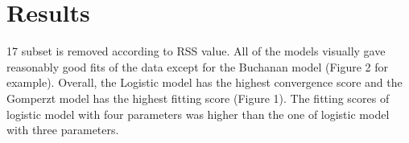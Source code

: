 \documentclass[a4paper,11pt]{article}
\theoremstyle{definition}
\begin{document}
\section{Results}
\begin{center}
\begin{table}[]
\caption {AIC and BIC fitting scores of candidate modesl}
\begin{threeparttable}

 \begin{tablenotes}
        \footnotesize
        \item[] 
      \end{tablenotes}
    \end{threeparttable}
\end{table}
\end{center}
17 subset is removed according to RSS value. All of the models visually gave reasonably good fits of the data except for the Buchanan model (Figure 2 for example). Overall, the Logistic model has the highest convergence score and the Gomperzt model has the highest fitting score (Figure 1). The fitting scores of logistic model with four parameters was higher than the one of logistic model with three parameters. 
\end{document}
